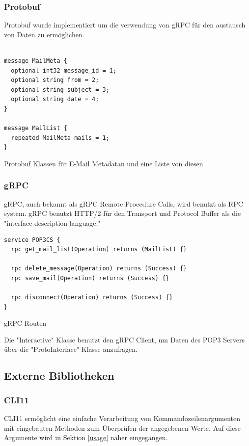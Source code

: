 \documentclass[12pt, letterpaper]{article}
\newenvironment{code}{\captionsetup{type=listing}}{}
\begin{document}
\subsubsection{Protobuf}
Protobuf\cite{protobuf} wurde implementiert um die verwendung von gRPC für den austausch von Daten zu ermöglichen.
\begin{code}
  \begin{verbatim}

message MailMeta {
  optional int32 message_id = 1;
  optional string from = 2;
  optional string subject = 3;
  optional string date = 4;
}

message MailList {
  repeated MailMeta mails = 1;
}

  \end{verbatim}
  \caption{Protobuf Klassen für E-Mail Metadatan und eine Liste von diesen}
\end{code}

\subsubsection{gRPC}

gRPC\cite{grpc}, auch bekannt als gRPC Remote Procedure Calls, wird benutzt als RPC system. gRPC benutzt HTTP/2 für den Transport und Protocol Buffer als die "interface description language."
\begin{code}
  \begin{verbatim}
service POP3CS {
  rpc get_mail_list(Operation) returns (MailList) {}

  rpc delete_message(Operation) returns (Success) {}
  rpc save_mail(Operation) returns (Success) {}

  rpc disconnect(Operation) returns (Success) {}
}
  \end{verbatim}
  \caption{gRPC Routen}
\end{code}

Die "Interactive" Klasse benutzt den gRPC Client, um Daten des POP3 Servers über die "ProtoInterface" Klasse anzufragen.

\subsection{Externe Bibliotheken}
\label{extBib}

\subsubsection{CLI11}
CLI11\cite{cli11_ref} ermöglicht eine einfache Verarbeitung von Kommandozeilenargumenten mit eingebauten Methoden zum Überprüfen der angegebenen Werte. Auf diese Argumente wird in Sektion \ref{usage} näher eingegangen.
\end{document}
